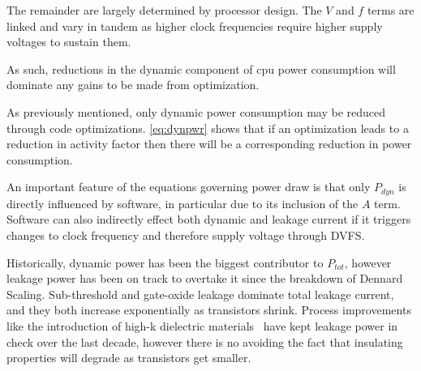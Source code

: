 The remainder are largely determined by processor design. The $V$ and $f$ terms are linked and vary in tandem as higher clock frequencies require higher supply voltages to sustain them. 


As such, reductions in the dynamic component of cpu power consumption will dominate any gains to be made from optimization. 

As previously mentioned, only dynamic power consumption may be reduced through code optimizations. \autoref{eq:dynpwr} shows that if an optimization leads to a reduction in activity factor then there will be a corresponding reduction in power consumption. 


An important feature of the equations governing power draw is that only $P_{dyn}$ is directly influenced by software, in particular due to its inclusion of the $A$ term. Software can also indirectly effect both dynamic and leakage current if it triggers changes to clock frequency and therefore supply voltage through DVFS.  

Historically, dynamic power has been the biggest contributor to $P_{tot}$, however leakage power has been on track to overtake it since the breakdown of Dennard Scaling.  Sub-threshold and gate-oxide leakage dominate total leakage current, and they both increase exponentially as transistors shrink. Process improvements like the introduction of high-k dielectric materials~\cite{jan:2009aa} have kept leakage power in check over the last decade, however there is no avoiding the fact that insulating properties will degrade as transistors get smaller.
